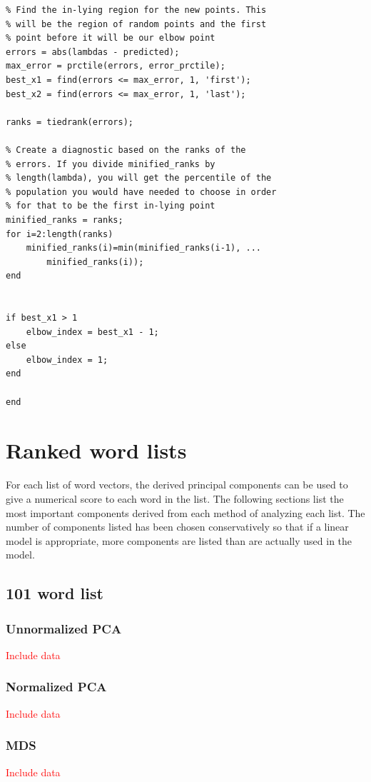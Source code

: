 \documentclass[10pt,letterpaper]{book}
\newcommand{\todo}[1]{\textcolor{red}{#1}}
\begin{document}
\begin{lstlisting}
% Find the in-lying region for the new points. This
% will be the region of random points and the first
% point before it will be our elbow point
errors = abs(lambdas - predicted);
max_error = prctile(errors, error_prctile);
best_x1 = find(errors <= max_error, 1, 'first');
best_x2 = find(errors <= max_error, 1, 'last');

ranks = tiedrank(errors);

% Create a diagnostic based on the ranks of the
% errors. If you divide minified_ranks by 
% length(lambda), you will get the percentile of the
% population you would have needed to choose in order
% for that to be the first in-lying point
minified_ranks = ranks;
for i=2:length(ranks)
    minified_ranks(i)=min(minified_ranks(i-1), ...
        minified_ranks(i)); 
end


if best_x1 > 1
    elbow_index = best_x1 - 1;
else
    elbow_index = 1;
end

end
\end{lstlisting}

\chapter{Ranked word lists}
\label{app:rankedwordlists}
For each list of word vectors, the derived principal components can be used to 
give a numerical score to each word in the list. The following sections list
the most important components derived from each method of analyzing each list.
The number of components listed has been chosen conservatively so that if a
linear model is appropriate, more components are listed than are actually used
in the model.

\section{101 word list}
\subsection{Unnormalized PCA}
\label{app:rankedwordlists:101words:unnormalized}
\todo{Include data}
\subsection{Normalized PCA}
\label{app:rankedwordlists:101words:normalized}
\todo{Include data}
\subsection{MDS}
\label{app:rankedwordlists:101words:mds}
\todo{Include data}
\end{document}
